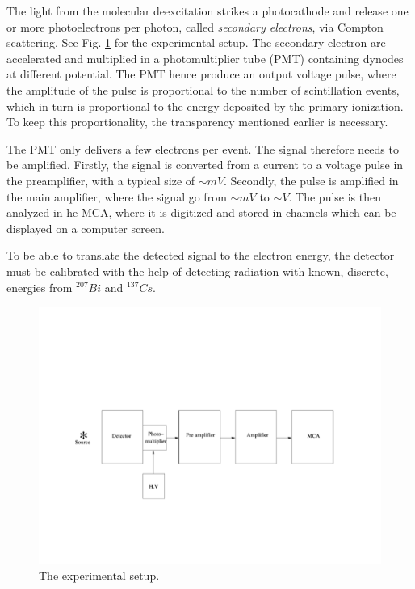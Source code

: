 \documentclass[a4,11pt, notitlepage]{article}
\begin{document}
The light from the molecular deexcitation strikes a photocathode and
release one or more photoelectrons per photon, called
\textit{secondary electrons}, via Compton scattering. See
Fig. \ref{fig:setup} for the experimental setup. The secondary
electron are accelerated and multiplied in a photomultiplier tube
(PMT) containing dynodes at different potential. The PMT hence produce
an output voltage pulse, where the amplitude of the pulse is
proportional to the number of scintillation events, which in turn is
proportional to the energy deposited by the primary ionization. To
keep this proportionality, the transparency mentioned earlier is
necessary.

The PMT only delivers a few electrons per event. The signal therefore
needs to be amplified. Firstly, the signal is converted from a current
to a voltage pulse in the preamplifier, with a typical size of
$\sim mV$. Secondly, the pulse is amplified in the main amplifier,
where the signal go from $\sim mV$ to $\sim V$. The pulse is then
analyzed in he MCA, where it is digitized and stored in channels which
can be displayed on a computer screen.

To be able to translate the detected signal to the electron energy,
the detector must be calibrated with the help of detecting radiation
with known, discrete, energies from $^{207}Bi$ and $^{137}Cs$.

\begin{figure}[htp]
  \vspace{40pt}
  \begin{center}
    \includegraphics[width=15.0cm]{figures/Setup.png}
    \caption{The experimental setup.}
\label{fig:setup}
  \end{center}
\end{figure}
\end{document}
